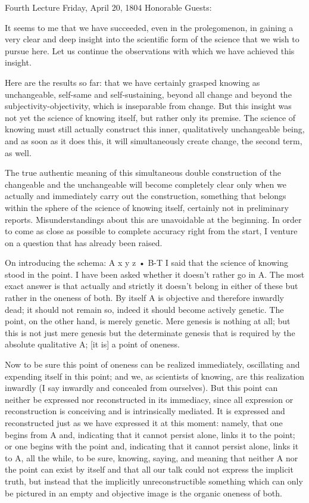 Fourth Lecture
Friday, April 20, 1804
Honorable Guests:

It seems to me that we have succeeded,
even in the prolegomenon,
in gaining a very clear and deep insight
into the scientific form of the science
that we wish to pursue here.
Let us continue the observations
with which we have achieved this insight.

Here are the results so far:
that we have certainly grasped knowing
as unchangeable, self-same and self-sustaining,
beyond all change and beyond the subjectivity-objectivity,
which is inseparable from change.
But this insight was not yet the science of knowing itself,
but rather only its premise.
The science of knowing must still actually construct
this inner, qualitatively unchangeable being,
and as soon as it does this,
it will simultaneously create change,
the second term, as well.

The true authentic meaning of this
simultaneous double construction
of the changeable and the unchangeable
will become completely clear
only when we actually and immediately
carry out the construction,
something that belongs within the sphere
of the science of knowing itself,
certainly not in preliminary reports.
Misunderstandings about this are unavoidable at the beginning.
In order to come as close as possible to
complete accuracy right from the start,
I venture on a question that has already been raised.

On introducing the schema:
A
x y z • B-T
I said that the science of knowing stood in the point.
I have been asked whether it doesn't rather go in A.
The most exact answer is that actually and strictly
it doesn't belong in either of these
but rather in the oneness of both.
By itself A is objective and therefore inwardly dead;
it should not remain so, indeed it should become actively genetic.
The point, on the other hand, is merely genetic.
Mere genesis is nothing at all; but this is not just
mere genesis but the determinate genesis that is required by
the absolute qualitative A; [it is] a point of oneness.

Now to be sure this point of oneness can be realized immediately,
oscillating and expending itself in this point;
and we, as scientists of knowing, are this realization inwardly
(I say inwardly and concealed from ourselves).
But this point can neither be expressed nor reconstructed
in its immediacy, since all expression or reconstruction is
conceiving and is intrinsically mediated.
It is expressed and reconstructed just as we have expressed it
at this moment: namely, that one begins from A and,
indicating that it cannot persist alone,
links it to the point;
or one begins with the point and,
indicating that it cannot persist alone,
links it to A, all the while, to be sure,
knowing, saying, and meaning that
neither A nor the point can exist by itself and
that all our talk could not express the implicit truth,
but instead that the implicitly unreconstructible something
which can only be pictured in an empty and objective image is
the organic oneness of both.

